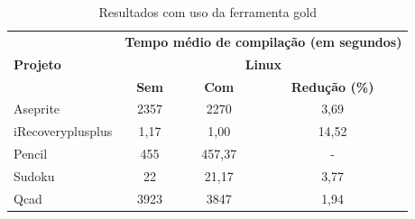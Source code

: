 \begin{table}[!ht]
\tiny
\centering
\caption{Resultados com uso da ferramenta gold}
\label{tab:gold}
\begin{tabular}{lccc}
& \multicolumn{3}{c}{\textbf{Tempo médio de compilação (em segundos)} } \\
\textbf{Projeto} & \multicolumn{3}{c}{\textbf{Linux}} \\ 
& \textbf{Sem } & \textbf{Com }  & \textbf{Redução (\%)} \\
\toprule
Aseprite & 2357 & 2270  & 3,69 \\
iRecoveryplusplus & 1,17 & 1,00 & 14,52 \\
Pencil & 455  & 457,37 & - \\ 
Sudoku & 22 & 21,17 & 3,77  \\
Qcad  & 3923 & 3847 & 1,94 \\
\end{tabular}
\end{table}
